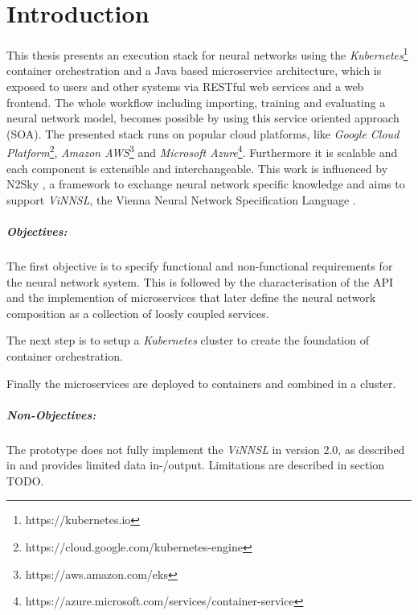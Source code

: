 \chapter{Introduction}\label{introduction}

This thesis presents an execution stack for neural networks using the
\emph{Kubernetes}\footnote{https://kubernetes.io} container
orchestration and a Java based microservice architecture, which is
exposed to users and other systems via RESTful web services and a web
frontend. The whole workflow including importing, training and
evaluating a neural network model, becomes possible by using this
service oriented approach (SOA). The presented stack runs on popular
cloud platforms, like \emph{Google Cloud Platform}\footnote{https://cloud.google.com/kubernetes-engine},
\emph{Amazon AWS}\footnote{https://aws.amazon.com/eks} and
\emph{Microsoft Azure}\footnote{https://azure.microsoft.com/services/container-service}.
Furthermore it is scalable and each component is extensible and
interchangeable. This work is influenced by N2Sky \cite{schikuta_2013},
a framework to exchange neural network specific knowledge and aims to
support \emph{ViNNSL}, the Vienna Neural Network Specification Language
\cite{kopica_2015} \cite{beran_2008}.

\paragraph{Objectives:}\label{objectives}

The first objective is to specify functional and non-functional
requirements for the neural network system. This is followed by the
characterisation of the API and the implemention of microservices that
later define the neural network composition as a collection of loosly
coupled services.

The next step is to setup a \emph{Kubernetes} cluster to create the
foundation of container orchestration.

Finally the microservices are deployed to containers and combined in a
cluster.

\paragraph{Non-Objectives:}\label{non-objectives}

The prototype does not fully implement the \emph{ViNNSL} in version 2.0,
as described in \cite{kopica_2015} and provides limited data in-/output.
Limitations are described in section TODO.

